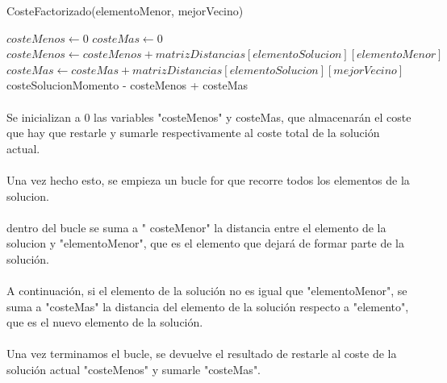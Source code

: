\documentclass{article}
\begin{document}
		\begin{algorithm}[H]
			\caption{CosteFactorizado(elementoMenor, mejorVecino)}
			\begin{algorithmic}
				\STATE $costeMenos \leftarrow 0$
				\STATE $costeMas \leftarrow 0$
				\STATE $costeMenos \leftarrow costeMenos + matrizDistancias[elementoSolucion][elementoMenor]$
				\STATE $costeMas \leftarrow costeMas+matrizDistancias[elementoSolucion][mejorVecino]$
				\ENDIF
				\ENDFOR
				\RETURN costeSolucionMomento - costeMenos + costeMas	
			\end{algorithmic}
		\end{algorithm}
	
			\paragraph{}Se inicializan a 0 las variables "costeMenos" y costeMas, que almacenarán el coste que hay que restarle y sumarle respectivamente al coste total de la solución actual.
		
		\paragraph{}Una vez hecho esto, se empieza un bucle for que recorre todos los elementos de la solucion.
		
		\paragraph{}dentro del bucle se suma a " costeMenor" la distancia entre el elemento de la solucion y "elementoMenor", que es el elemento que dejará de formar parte de la solución.
		
		\paragraph{}A continuación, si el elemento de la solución no es igual que "elementoMenor", se suma a "costeMas" la distancia del elemento de la solución respecto a "elemento", que es el nuevo elemento de la solución. 
		
		\paragraph{}Una vez terminamos el bucle, se devuelve el resultado de restarle al coste de la solución actual "costeMenos" y sumarle "costeMas".
		
\end{document}
